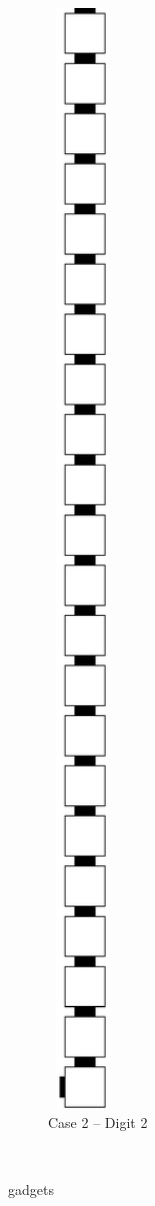 \begin{enumerate}[label={--}]
\begin{figure}[H]
                    \begin{subfigure}[t]{0.2\textwidth}
                        \centering
                        \includegraphics[width=0.2\textwidth]{warping/post_warp_case2_digit2_msr}
                        \caption{\label{fig:warping/post_warp_case2_digit2_msr} Case 2 -- Digit 2}
                    \end{subfigure}%
                    ~
                    \caption{\label{fig:post_warp_gadgets} {\postwarp} gadgets }
                \end{figure}

        \end{enumerate}

